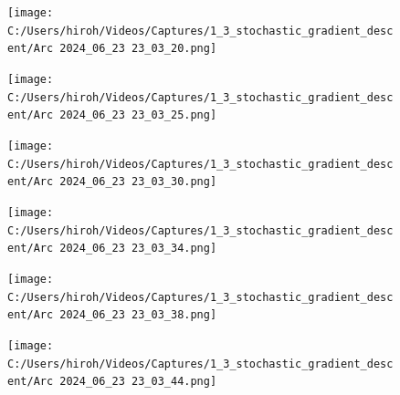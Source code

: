 \documentclass{ltjsarticle}
\begin{document}
\begin{figure}[htbp]
  \centering
  \texttt{[image: C:/Users/hiroh/Videos/Captures/1\_3\_stochastic\_gradient\_descent/Arc 2024\_06\_23 23\_03\_20.png]}
\end{figure}
\begin{figure}[htbp]
  \centering
  \texttt{[image: C:/Users/hiroh/Videos/Captures/1\_3\_stochastic\_gradient\_descent/Arc 2024\_06\_23 23\_03\_25.png]}
\end{figure}
\begin{figure}[htbp]
  \centering
  \texttt{[image: C:/Users/hiroh/Videos/Captures/1\_3\_stochastic\_gradient\_descent/Arc 2024\_06\_23 23\_03\_30.png]}
\end{figure}
\begin{figure}[htbp]
  \centering
  \texttt{[image: C:/Users/hiroh/Videos/Captures/1\_3\_stochastic\_gradient\_descent/Arc 2024\_06\_23 23\_03\_34.png]}
\end{figure}
\begin{figure}[htbp]
  \centering
  \texttt{[image: C:/Users/hiroh/Videos/Captures/1\_3\_stochastic\_gradient\_descent/Arc 2024\_06\_23 23\_03\_38.png]}
\end{figure}
\begin{figure}[htbp]
  \centering
  \texttt{[image: C:/Users/hiroh/Videos/Captures/1\_3\_stochastic\_gradient\_descent/Arc 2024\_06\_23 23\_03\_44.png]}
\end{figure}
\end{document}

